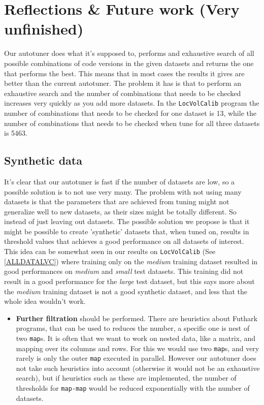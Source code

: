 \section{Reflections \& Future work (Very unfinished)}

Our autotuner does what it's supposed to, performs and exhaustive search of all
possible combinations of code versions in the given datasets and returns the
one that performs the best. This means that in most cases the results it gives
are better than the current autotuner. The problem it has is that to perform an
exhaustive search and the number of combinations that needs to be checked increases
very quickly as you add more datasets. In the \texttt{LocVolCalib} program the
number of combinations that needs to be checked for one dataset is 13, while
the number of combinations that needs to be checked when tune for all
three datasets is 5463. 

\subsection{Synthetic data}
It's clear that our autotuner is fast if the number of datasets are low, so a
possible solution is to not use very many. The problem with not using many
datasets is that the parameters that are achieved from tuning might not
generalize well to new datasets, as their sizes might be totally different. So
instead of just leaving out datasets. The possible solution we propose is that
it might be possible to create 'synthetic' datasets that, when tuned on,
results in threshold values that achieves a good performance on all datasets of
interest. 
This idea can be somewhat seen in our results on \texttt{LocVolCalib} (See \ref{ALLDATALVC})
where training only on the \textit{medium} training  dataset resulted in good
performances on \textit{medium} and \textit{small} test datasets. This training
did not result in a good performance for the \textit{large} test dataset, but
this says more about the \textit{medium} training dataset is not a good
synthetic dataset, and less that the whole idea wouldn't work.

\begin{itemize}
	\item \textbf{Further filtration} should be performed. There are heuristics
    about Futhark programs, that can be used to reduces the number, a specific
    one is nest of two \texttt{map}s. It is often that we want to work on
    nested data, like a matrix, and mapping over its columns and rows. For this
    we would use two \texttt{map}s, and very rarely is only the outer
    \texttt{map} executed in parallel. However our autotuner does not take such
    heuristics into account (otherwise it would not be an exhaustive search),
    but if heuristics such as these are implemented, the number of thresholds
    for \texttt{map-map} would be reduced exponentially with the number of
    datasets.
\end{itemize}

